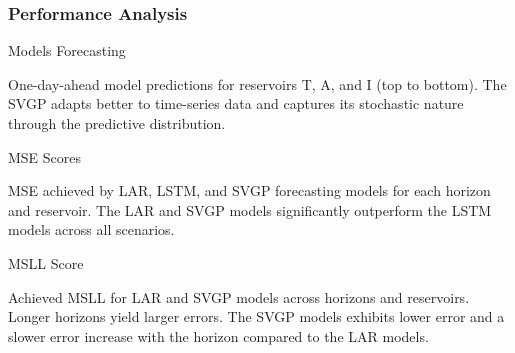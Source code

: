 \subsubsection{Performance Analysis}


\begin{frame}{Models Forecasting}
	\begin{figure}[htbp]
		\centering
		\setlength\figurewidth{\columnwidth} 
		\setlength{}
		
		\hfill
		\hfill
		
		
	\end{figure}
	\vspace{-1.4em}
	\begin{block}{}
	One-day-ahead model predictions for reservoirs T, A, and I (top to bottom). The SVGP adapts better to time-series data and captures its stochastic nature through the predictive distribution.
	\end{block}
\end{frame}


\begin{frame}{MSE Scores}
	\begin{figure}[htbp]
		\setlength{} 
		\setlength{}
		\subfloat[LAR.]{}\hspace{-1.5em}
		\subfloat[LSTM.]{}\hspace{-1.5em}
		\subfloat[SVGP.]{}
	\end{figure}
	\vspace{-1.5em}
	\begin{block}{}
	MSE achieved by LAR, LSTM, and SVGP forecasting models for each horizon and reservoir. The LAR and SVGP models significantly outperform the LSTM models across all scenarios.
	\end{block}
\end{frame}

\begin{frame}{MSLL Score}
	\begin{figure}[htbp]
		\setlength{} 
		\setlength{}
		\subfloat[LAR.]{}\hspace{-1.5em}
		\subfloat[SVGP.]{}
	\end{figure}
	\vspace{-1.8em}
	\begin{block}{}
	Achieved MSLL for LAR and SVGP models across horizons and reservoirs. Longer horizons yield larger errors. The SVGP models exhibits lower error and a slower error increase with the horizon compared to the LAR models.
	\end{block}
\end{frame}


